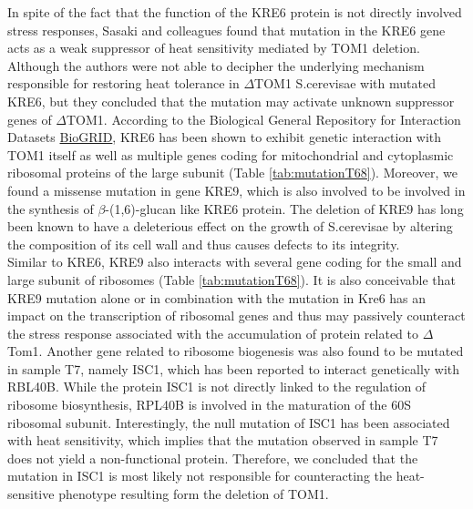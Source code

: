 \documentclass[10pt,a4paper]{article}
\begin{document}
\noindent In spite of the fact that the function of the KRE6 protein is not directly involved stress responses, Sasaki and colleagues found that mutation in the KRE6 gene acts as a weak suppressor of heat sensitivity mediated by TOM1 deletion\cite{sasaki_extragenic_2000}.\\

\noindent Although the authors were not able to decipher the underlying mechanism responsible for restoring heat tolerance in $\Delta$TOM1 S.cerevisae with mutated KRE6, but they concluded that the mutation may activate unknown suppressor genes of $\Delta$TOM1. According to the Biological General Repository for Interaction Datasets \href{https://thebiogrid.org/}{BioGRID}, KRE6 has been shown to exhibit genetic interaction with TOM1 itself as well as multiple genes coding for mitochondrial and cytoplasmic ribosomal proteins of the large subunit (Table \ref{tab:mutationT68}). Moreover, we found a missense mutation in gene KRE9, which is also involved to be involved in the synthesis of $\beta$-(1,6)-glucan like KRE6 protein. The deletion of KRE9  has long been known to have a deleterious effect on the growth of S.cerevisae by altering the composition of its cell wall and thus causes defects to its integrity\cite{brown_yeast_1993}.\\

\noindent Similar to KRE6, KRE9 also interacts with several gene coding for the small and large subunit of ribosomes (Table \ref{tab:mutationT68}). It is also conceivable that KRE9 mutation alone or in combination with the mutation in Kre6 has an impact on the transcription of ribosomal genes and thus may passively counteract the stress response associated with the accumulation of protein related to $\Delta$Tom1. Another gene related to ribosome biogenesis was also found to be mutated in sample T7, namely ISC1, which has been reported to interact genetically with RBL40B\cite{hoppins_mitochondrial-focused_2011}. While the protein ISC1 is not directly linked to the regulation of ribosome biosynthesis, RPL40B is involved in the maturation of the 60S ribosomal subunit\cite{fernandez-pevida_yeast_2012}. Interestingly, the null mutation of ISC1 has been associated with heat sensitivity, which implies that the mutation observed in sample T7 does not yield a non-functional protein. Therefore, we concluded that the mutation in ISC1 is most likely not responsible for counteracting the heat-sensitive phenotype resulting form the deletion of TOM1.\\
\end{document}
